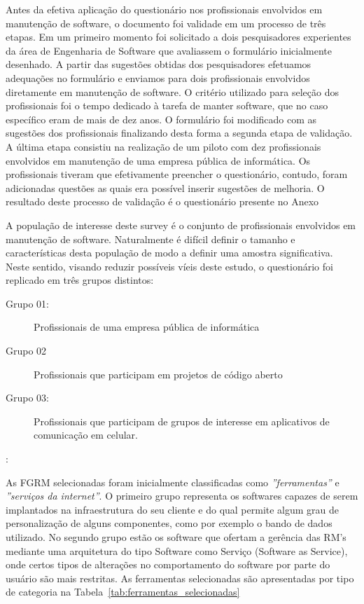 Antes da efetiva aplicação do questionário nos profissionais envolvidos em
manutenção de software, o documento foi validade em um processo de três etapas.
Em um primeiro momento foi solicitado a dois pesquisadores experientes da área
de Engenharia de Software que avaliassem o formulário inicialmente desenhado. A
partir das sugestões obtidas dos pesquisadores efetuamos adequações no
formulário e enviamos para dois profissionais envolvidos diretamente em
manutenção de software. O critério utilizado para seleção dos profissionais foi
o tempo dedicado à tarefa de manter software, que no caso específico eram de
mais de dez anos. O formulário foi modificado com as sugestões dos profissionais
finalizando desta forma a segunda etapa de validação. A última etapa consistiu
na realização de um piloto com dez profissionais envolvidos em manutenção de uma
empresa pública de informática. Os profissionais tiveram que efetivamente
preencher o questionário, contudo, foram adicionadas questões as quais era
possível inserir sugestões de melhoria. O resultado deste processo de validação
é o questionário presente no Anexo

A população de interesse deste survey é o conjunto de profissionais envolvidos
em manutenção de software. Naturalmente é difícil definir o tamanho e
características desta população de modo a definir uma amostra significativa.
Neste sentido, visando reduzir possíveis víeis deste estudo, o questionário foi
replicado em três grupos distintos:

\begin{description}
	\item[Grupo 01:] Profissionais de uma empresa pública de informática
	\item[Grupo 02] Profissionais que participam em projetos de código aberto
	\item[Grupo 03:] Profissionais que participam de grupos de interesse em
		aplicativos de comunicação em celular.	
\end{description}

:%

As FGRM selecionadas foram inicialmente classificadas como
\textit{''ferramentas''} e \textit{''serviços da internet''}. O primeiro grupo
representa os softwares capazes de serem implantados na infraestrutura do seu
cliente e do qual permite algum grau de personalização de alguns componentes,
como por exemplo o bando de dados utilizado. No segundo grupo estão os software
que ofertam a gerência das RM's mediante uma arquitetura do tipo Software como
Serviço (Software as Service), onde certos tipos de alterações no comportamento
do software por parte do usuário são mais restritas. As ferramentas selecionadas
são apresentadas por tipo de categoria na
Tabela~\ref{tab:ferramentas_selecionadas}


